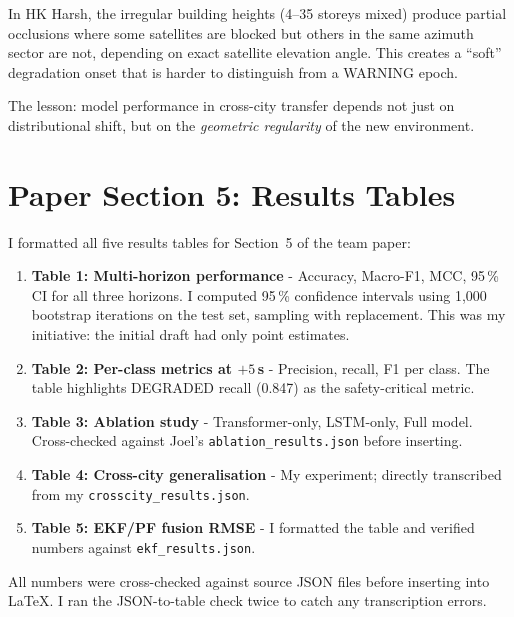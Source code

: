 \documentclass[12pt,a4paper]{article}
\newcommand{\code}[1]{\texttt{#1}}
\begin{document}
In HK Harsh, the irregular building heights (4--35 storeys mixed) produce partial
occlusions where some satellites are blocked but others in the same azimuth sector are
not, depending on exact satellite elevation angle.
This creates a ``soft'' degradation onset that is harder to distinguish from a WARNING
epoch.

The lesson: model performance in cross-city transfer depends not just on distributional
shift, but on the \emph{geometric regularity} of the new environment.

\section{Paper Section 5: Results Tables}

I formatted all five results tables for Section~5 of the team paper:

\begin{enumerate}
  \item \textbf{Table 1: Multi-horizon performance} - Accuracy, Macro-F1, MCC, 95\,\%
    CI for all three horizons.
    I computed 95\,\% confidence intervals using 1,000 bootstrap iterations on the test
    set, sampling with replacement.
    This was my initiative: the initial draft had only point estimates.

  \item \textbf{Table 2: Per-class metrics at $+5$\,s} - Precision, recall, F1 per class.
    The table highlights DEGRADED recall (0.847) as the safety-critical metric.

  \item \textbf{Table 3: Ablation study} - Transformer-only, LSTM-only, Full model.
    Cross-checked against Joel's \code{ablation\_results.json} before inserting.

  \item \textbf{Table 4: Cross-city generalisation} - My experiment; directly transcribed
    from my \code{crosscity\_results.json}.

  \item \textbf{Table 5: EKF/PF fusion RMSE} - I formatted the
    table and verified numbers against \code{ekf\_results.json}.
\end{enumerate}

All numbers were cross-checked against source JSON files before inserting into LaTeX.
I ran the JSON-to-table check twice to catch any transcription errors.
\end{document}
